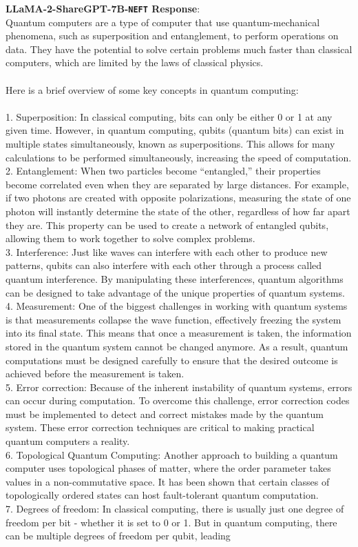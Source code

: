 \documentclass{article} %
\newcommand{\neft}{\texttt{NEFT}}
\newcommand{\llama}{LLaMA}
\begin{document}
\begin{tcolorbox}[breakable,boxrule=0pt]
  \textbf{\llama{}-2-ShareGPT-7B-\neft{} Response}:\\Quantum computers are a type of computer that use quantum-mechanical phenomena, such as superposition and entanglement, to perform operations on data. They have the potential to solve certain problems much faster than classical computers, which are limited by the laws of classical physics.\\\\Here is a brief overview of some key concepts in quantum computing:\\\\1. Superposition: In classical computing, bits can only be either 0 or 1 at any given time. However, in quantum computing, qubits (quantum bits) can exist in multiple states simultaneously, known as superpositions. This allows for many calculations to be performed simultaneously, increasing the speed of computation.\\2. Entanglement: When two particles become ``entangled,'' their properties become correlated even when they are separated by large distances. For example, if two photons are created with opposite polarizations, measuring the state of one photon will instantly determine the state of the other, regardless of how far apart they are. This property can be used to create a network of entangled qubits, allowing them to work together to solve complex problems.\\3. Interference: Just like waves can interfere with each other to produce new patterns, qubits can also interfere with each other through a process called quantum interference. By manipulating these interferences, quantum algorithms can be designed to take advantage of the unique properties of quantum systems.\\4. Measurement: One of the biggest challenges in working with quantum systems is that measurements collapse the wave function, effectively freezing the system into its final state. This means that once a measurement is taken, the information stored in the quantum system cannot be changed anymore. As a result, quantum computations must be designed carefully to ensure that the desired outcome is achieved before the measurement is taken.\\5. Error correction: Because of the inherent instability of quantum systems, errors can occur during computation. To overcome this challenge, error correction codes must be implemented to detect and correct mistakes made by the quantum system. These error correction techniques are critical to making practical quantum computers a reality.\\6. Topological Quantum Computing: Another approach to building a quantum computer uses topological phases of matter, where the order parameter takes values in a non-commutative space. It has been shown that certain classes of topologically ordered states can host fault-tolerant quantum computation.\\7. Degrees of freedom: In classical computing, there is usually just one degree of freedom per bit - whether it is set to 0 or 1. But in quantum computing, there can be multiple degrees of freedom per qubit, leading 
\end{tcolorbox}
\end{document}
